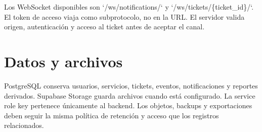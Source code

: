 Los WebSocket disponibles son `/ws/notifications/` y `/ws/tickets/\{ticket\_id\}/`. El token de
acceso viaja como subprotocolo, no en la URL. El servidor valida origen, autenticación y acceso al
ticket antes de aceptar el canal.

\section{Datos y archivos}

{ PostgreSQL conserva usuarios, servicios, tickets, eventos, notificaciones y
reportes derivados. Supabase Storage guarda archivos cuando está configurado. La service role key
pertenece únicamente al backend. Los objetos, backups y exportaciones deben seguir la misma
política de retención y acceso que los registros relacionados.\par}

